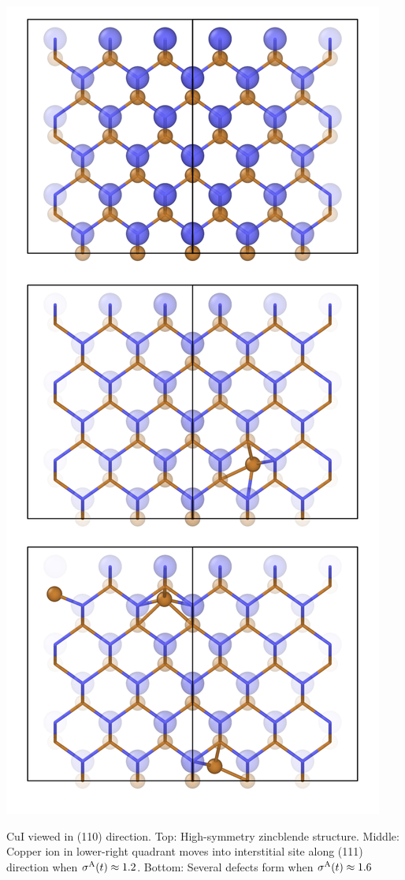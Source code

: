 \begin{marginfigure}
	\includegraphics[width=\textwidth]{./data/plots/defects/216.02.CuI/all.pdf}
	\caption{CuI viewed in (110) direction. Top: High-symmetry zincblende structure. Middle: Copper ion in lower-right quadrant moves into interstitial site along (111) direction when $\sigma^\mathrm{A} (t) \approx 1.2$. Bottom: Several defects form when $\sigma^\mathrm{A} (t) \approx 1.6$}
	\label{fig:defects.CuI.1}
\end{marginfigure} 
